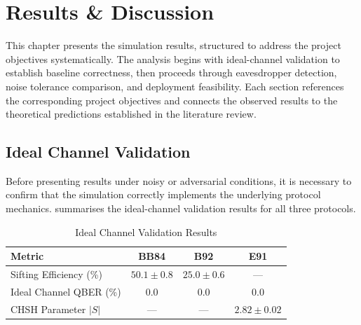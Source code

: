 

%
%

\chapter{Results \& Discussion}

This chapter presents the simulation results, structured to address the project objectives systematically. The analysis begins with ideal-channel validation to establish baseline correctness, then proceeds through eavesdropper detection, noise tolerance comparison, and deployment feasibility. Each section references the corresponding project objectives and connects the observed results to the theoretical predictions established in the literature review.


\section{Ideal Channel Validation}

Before presenting results under noisy or adversarial conditions, it is necessary to confirm that the simulation correctly implements the underlying protocol mechanics.  summarises the ideal-channel validation results for all three protocols.

\begin{table}[ht]
    \centering
    \caption{Ideal Channel Validation Results}
    \label{tab:validation}
    \begin{tabular}{l c c c}
        \toprule
        \textbf{Metric} & \textbf{BB84} & \textbf{B92} & \textbf{E91} \\
        \midrule
        Sifting Efficiency (\%) & $50.1 \pm 0.8$ & $25.0 \pm 0.6$ & --- \\
        Ideal Channel QBER (\%) & $0.0$ & $0.0$ & $0.0$ \\
        CHSH Parameter $|S|$ & --- & --- & $2.82 \pm 0.02$ \\
        \bottomrule
    \end{tabular}
\end{table}

